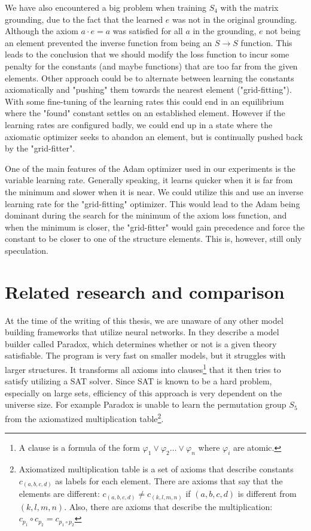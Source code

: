 We have also encountered a big problem when training $S_4$ with the matrix grounding, due to the fact that the learned $e$ was not in the original grounding. Although the axiom $a\cdot e=a$ was satisfied for all $a$ in the grounding, $e$ not being an element prevented the inverse function from being an $S\rightarrow S$ function. This leads to the conclusion that we should modify the loss function to incur some penalty for the constants (and maybe functions) that are too far from the given elements. Other approach could be to alternate between learning the constants axiomatically and "pushing" them towards the nearest element ("grid-fitting"). With some fine-tuning of the learning rates this could end in an equilibrium where the "found" constant settles on an established element. However if the learning rates are configured badly, we could end up in a state where the axiomatic optimizer seeks to abandon an element, but is continually pushed back by the "grid-fitter".

One of the main features of the Adam optimizer used in our experiments is the variable learning rate. Generally speaking, it learns quicker when it is far from the minimum and slower when it is near. We could utilize this and use an inverse learning rate for the "grid-fitting" optimizer. This would lead to the Adam being dominant during the search for the minimum of the axiom loss function, and when the minimum is closer, the "grid-fitter" would gain precedence and force the constant to be closer to one of the structure elements. This is, however, still only speculation.

\section*{Related research and comparison}

At the time of the writing of this thesis, we are unaware of any other model building frameworks that utilize neural networks. In \cite{paradox} they describe a model builder called Paradox, which determines whether or not is a given theory satisfiable. The program is very fast on smaller models, but it struggles with larger structures. It transforms all axioms into clauses\footnote{A clause is a formula of the form $\varphi_1\vee \varphi_2\dots\vee \varphi_n$ where $\varphi_i$ are atomic.} that it then tries to satisfy utilizing a SAT solver. Since SAT is known to be a hard problem, especially on large sets, efficiency of this approach is very dependent on the universe size. For example Paradox is unable to learn the permutation group $S_5$ from the axiomatized multiplication table\footnote{Axiomatized multiplication table is a set of axioms that describe constants $c_{(a,b,c,d)}$ as labels for each element. There are axioms that say that the elements are different: $c_{(a,b,c,d)}\neq c_{(k,l,m,n)}$ if $(a,b,c,d)$ is different from $(k,l,m,n)$. Also, there are axioms that describe the multiplication: $c_{p_1}\circ c_{p_2}=c_{p_1\circ p_2}$}. 